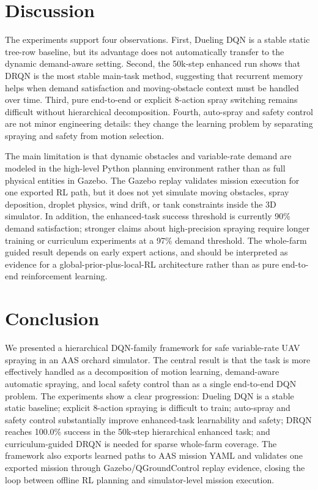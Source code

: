 \documentclass[conference,10pt]{IEEEtran}
\begin{document}
\section{Discussion}
The experiments support four observations. First, Dueling DQN is a stable static tree-row baseline, but its advantage does not automatically transfer to the dynamic demand-aware setting. Second, the 50k-step enhanced run shows that DRQN is the most stable main-task method, suggesting that recurrent memory helps when demand satisfaction and moving-obstacle context must be handled over time. Third, pure end-to-end or explicit 8-action spray switching remains difficult without hierarchical decomposition. Fourth, auto-spray and safety control are not minor engineering details: they change the learning problem by separating spraying and safety from motion selection.

The main limitation is that dynamic obstacles and variable-rate demand are modeled in the high-level Python planning environment rather than as full physical entities in Gazebo. The Gazebo replay validates mission execution for one exported RL path, but it does not yet simulate moving obstacles, spray deposition, droplet physics, wind drift, or tank constraints inside the 3D simulator. In addition, the enhanced-task success threshold is currently 90\% demand satisfaction; stronger claims about high-precision spraying require longer training or curriculum experiments at a 97\% demand threshold. The whole-farm guided result depends on early expert actions, and should be interpreted as evidence for a global-prior-plus-local-RL architecture rather than as pure end-to-end reinforcement learning.

\section{Conclusion}
We presented a hierarchical DQN-family framework for safe variable-rate UAV spraying in an AAS orchard simulator. The central result is that the task is more effectively handled as a decomposition of motion learning, demand-aware automatic spraying, and local safety control than as a single end-to-end DQN problem. The experiments show a clear progression: Dueling DQN is a stable static baseline; explicit 8-action spraying is difficult to train; auto-spray and safety control substantially improve enhanced-task learnability and safety; DRQN reaches 100.0\% success in the 50k-step hierarchical enhanced task; and curriculum-guided DRQN is needed for sparse whole-farm coverage. The framework also exports learned paths to AAS mission YAML and validates one exported mission through Gazebo/QGroundControl replay evidence, closing the loop between offline RL planning and simulator-level mission execution.



\end{document}
